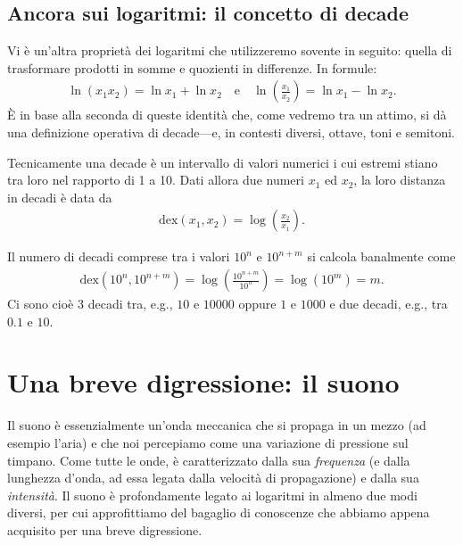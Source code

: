 \subsection{Ancora sui logaritmi: il concetto di decade}
\label{sec:decadi}

Vi è un'altra proprietà dei logaritmi che utilizzeremo sovente in seguito:
quella di trasformare prodotti in somme e quozienti in differenze. In formule:
\begin{align*}
  \ln (x_1 x_2) = \ln x_1 + \ln x_2 \quad \text{e} \quad
  \ln \left(\frac{x_1}{x_2}\right) = \ln x_1 - \ln x_2.
\end{align*}
\`E in base alla seconda di queste identità che, come vedremo tra un attimo,
si dà una definizione operativa di decade---e, in contesti diversi, ottave,
toni e semitoni.

Tecnicamente una decade è un intervallo di valori numerici i cui estremi
stiano tra loro nel rapporto di 1 a 10. Dati allora due numeri $x_1$ ed $x_2$,
la loro distanza in decadi è data da
\begin{align}\label{eq:distanza_in_decadi}
  \text{dex}(x_1, x_2) = \log\left( \frac{x_2}{x_1} \right).
\end{align}

\begin{examplebox}
  \begin{example}
    Il numero di decadi comprese tra i valori $10^n$ e $10^{n + m}$ si calcola
    banalmente come
    \begin{align*}
      \text{dex}(10^n, 10^{n + m}) = \log\left(\frac{10^{n + m}}{10^n}\right) = \log(10^m) = m.
    \end{align*}
    Ci sono cioè 3 decadi tra, e.g., $10$ e $10000$ oppure $1$ e $1000$
    e due decadi, e.g., tra $0.1$ e $10$.
  \end{example}
\end{examplebox}


\section{Una breve digressione: il suono}

Il suono è essenzialmente un'onda meccanica che si propaga in un mezzo
(ad esempio l'aria) e che noi percepiamo come una
variazione di pressione sul timpano. Come tutte le onde, è caratterizzato
dalla sua \emph{frequenza} (e dalla lunghezza d'onda, ad essa legata dalla
velocità di propagazione) e dalla sua \emph{intensità}.
Il suono è profondamente legato ai logaritmi in almeno due modi diversi, per
cui approfittiamo del bagaglio di conoscenze che abbiamo appena acquisito per
una breve digressione.


